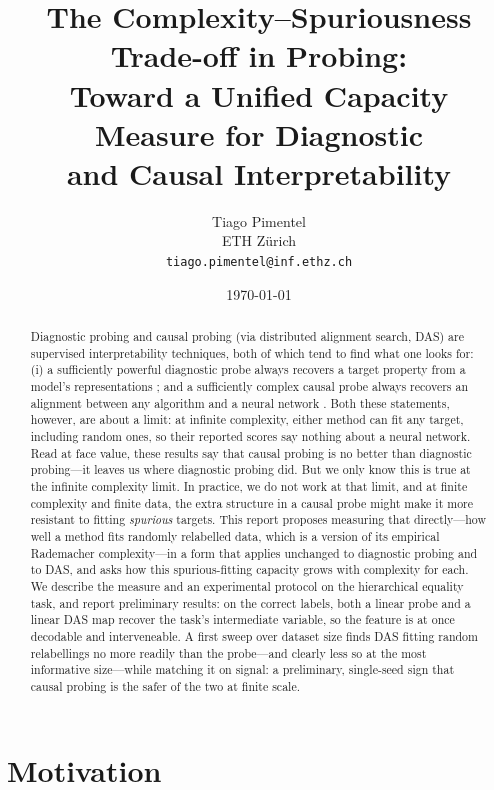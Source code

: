 \documentclass[11pt]{article}
\title{\textbf{The Complexity--Spuriousness Trade-off in Probing:\\
Toward a Unified Capacity Measure for Diagnostic\\ and Causal Interpretability}}
\author{Tiago Pimentel\\ \small ETH Z\"urich \\ \small \texttt{tiago.pimentel@inf.ethz.ch}}
\date{\today}
\begin{document}
\maketitle

\begin{abstract}
\noindent
Diagnostic probing and causal probing (via distributed alignment search, DAS) 
are supervised interpretability techniques, both of which
tend to find what one looks for: (i)
a sufficiently powerful diagnostic probe
always recovers a target property from a model's representations \citep{pimentel2020information}; and a
sufficiently complex causal probe always recovers an alignment between any algorithm and a 
neural network \citep{sutter2025nonlinear}. Both these statements, however, are about a limit: 
at infinite complexity, either method can fit any target, including random ones, so 
their reported scores say nothing about a neural network.
Read at face value, these results say that causal probing is no
better than diagnostic probing---it leaves us where diagnostic probing did. But we only know 
this is true at the infinite complexity limit. In practice, we do not work at that limit, 
and at finite complexity and finite data, the extra structure in a causal
probe might make it more resistant to fitting \emph{spurious} targets. This report proposes
measuring that directly---how well a method fits randomly relabelled data, which is a
version of its empirical Rademacher complexity---in a form that applies unchanged to
diagnostic probing and to DAS, and asks how this spurious-fitting capacity grows with
complexity for each. We describe
the measure and an experimental protocol on the hierarchical equality task, and report
preliminary results: on the correct labels, both a linear probe and a linear DAS map
recover the task's intermediate variable, so the feature is at once decodable and
interveneable. A first sweep over dataset size finds DAS fitting random relabellings no
more readily than the probe---and clearly less so at the most informative size---while
matching it on signal: a preliminary, single-seed sign that causal probing is the safer
of the two at finite scale.
\end{abstract}

\section{Motivation}\label{sec:motivation}
\end{document}

